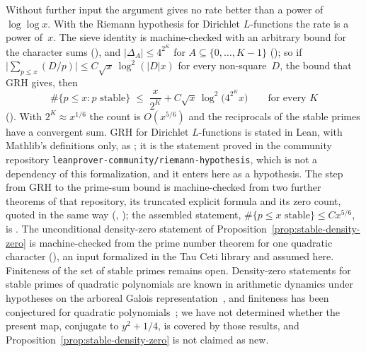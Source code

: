 Without further input the argument gives no rate better than a power of
$\log\log x$.  With the Riemann hypothesis for Dirichlet $L$-functions
the rate is a power of~$x$.  The sieve identity is machine-checked with
an arbitrary bound for the character sums
(),
and $|\Delta_A| \le 4^{2^K}$ for $A \subseteq \{0,\dots,K-1\}$
(); so if
$\bigl|\sum_{p \le x}(D/p)\bigr| \le C\sqrt{x}\,\log^2(|D|x)$ for
every non-square~$D$, the bound that GRH gives, then
\[
  \#\{p \le x : p \text{ stable}\} \;\le\; \frac{x}{2^K}
  + C\sqrt{x}\,\log^2\bigl(4^{2^K}x\bigr)\qquad\text{for every } K
\]
().  With
$2^K \approx x^{1/6}$ the count is $O(x^{5/6})$ and the reciprocals of
the stable primes have a convergent sum.  GRH for Dirichlet
$L$-functions is stated in Lean, with Mathlib's definitions only, as
; it is the
statement proved in the community repository
\texttt{leanprover-community/riemann-hypothesis}, which is not a
dependency of this formalization, and it enters here as a hypothesis.
The step from GRH to the prime-sum bound is machine-checked from two
further theorems of that repository, its truncated explicit formula and
its zero count, quoted in the same way
(,
);
the assembled statement, $\#\{p\le x \text{ stable}\}\le Cx^{5/6}$, is
.
The unconditional density-zero statement of
Proposition~\ref{prop:stable-density-zero} is machine-checked from the
prime number theorem for one quadratic character
(),
an input formalized in the Tau Ceti library and assumed here.
Finiteness of the set of stable primes remains open.
Density-zero statements for stable primes of quadratic polynomials are
known in arithmetic dynamics under hypotheses on the arboreal Galois
representation~\cite{Ferraguti2018}, and finiteness has been conjectured
for quadratic polynomials~\cite{Jones2012}; we have not determined
whether the present map, conjugate to $y^2 + 1/4$, is covered by those
results, and Proposition~\ref{prop:stable-density-zero} is not claimed as
new.

